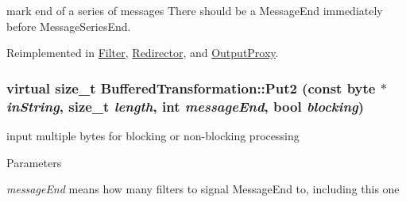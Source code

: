 mark end of a series of messages There should be a MessageEnd immediately before MessageSeriesEnd. 

Reimplemented in \hyperlink{class_filter_aa42c62587dda61266ac8195d9c9edb47}{Filter}, \hyperlink{class_redirector_a34c42c1730d031f486e5d285c6dc3314}{Redirector}, and \hyperlink{class_output_proxy_aecf5c216c060f2e6adfeb4019e6ad797}{OutputProxy}.\hypertarget{class_buffered_transformation_ad396dcb42260f23125a35ec0e5d17d55}{
\subsubsection[{Put2}]{\setlength{\rightskip}{0pt plus 5cm}virtual size\_\-t BufferedTransformation::Put2 (const byte $\ast$ {\em inString}, \/  size\_\-t {\em length}, \/  int {\em messageEnd}, \/  bool {\em blocking})}}
\label{class_buffered_transformation_ad396dcb42260f23125a35ec0e5d17d55}


input multiple bytes for blocking or non-\/blocking processing 
\begin{DoxyParams}{Parameters}
\item[{\em messageEnd}]means how many filters to signal MessageEnd to, including this one \end{DoxyParams}



